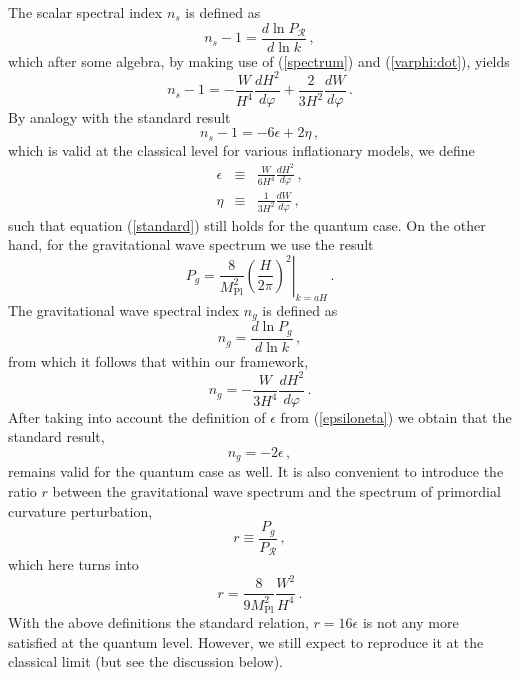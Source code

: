 \documentclass[aps,12pt,superscriptaddress,preprintnumbers,
                secnumarabic,nofootinbib,showpacs]{revtex4}
\begin{document}
The scalar spectral index $n_{s}$ is defined as
\begin{equation}
n_{s}-1 = \frac{d\ln P_{\mathcal{R}}}{d\ln k}\,, \label{spectral
index}
\end{equation}
which after some algebra, by making use of (\ref{spectrum}) and
(\ref{varphi:dot}), yields
\begin{equation}
n_s-1 =  -\frac{W}{H^4}\frac{dH^2}{d\varphi} +
\frac{2}{3H^2}\frac{dW}{d\varphi}
\,.
\label{spectral index final}
\end{equation}
By analogy with the standard result
\begin{equation}
n_s-1=-6\epsilon+2\eta\,,
\label{standard}
\end{equation}
which is valid at the classical level for various inflationary models,
we define
\begin{eqnarray}
\epsilon &\equiv & \frac{W}{6H^4}\frac{dH^2}{d\varphi}\,,\nonumber\\
\eta &\equiv & \frac{1}{3H^2}\frac{dW}{d\varphi}\,,
\label{epsiloneta}
\end{eqnarray}
such that equation (\ref{standard}) still holds for the quantum
case. On the other hand, for the gravitational wave spectrum we
use the result
\begin{equation}
P_g =
\frac{8}{M^2_{\mathrm{Pl}}}\left.\left(\frac{H}{2\pi}\right)^2\right|_{k=aH}\,.
\end{equation}
The gravitational wave spectral index $n_g$ is defined as
\begin{equation}
n_g = \frac{d\ln P_g}{d\ln k}\,, \label{gw spectral index}
\end{equation}
from which it follows that within our framework,
\begin{equation}
n_g = -\frac{W}{3H^4}\frac{dH^2}{d\varphi}\,.
\end{equation}
After taking into account the definition of $\epsilon$ from
(\ref{epsiloneta}) we obtain that the standard result,
\begin{equation}
n_g = -2\epsilon\,,
\label{ng:Q}
\end{equation}
remains valid for the quantum case as well. It is also convenient
to introduce the ratio $r$ between the gravitational wave spectrum
and the spectrum of primordial curvature perturbation,
\begin{equation}
r \equiv \frac{P_g}{P_{\mathcal{R}}}\,,
\end{equation}
which here turns into
\begin{equation}
r = \frac{8}{9M^2_{\mathrm{Pl}}}\frac{W^2}{H^4}\,.\label{ratio}
\end{equation}
With the above definitions the standard relation, $r=16\epsilon$
is not any more satisfied at the quantum
level. However, we still expect to reproduce it at the
classical limit (but see the discussion below).
\end{document}

